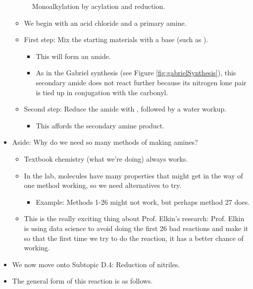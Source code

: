 \documentclass[../notes.tex]{subfiles}
\begin{document}
\begin{itemize}
\begin{figure}[H]
        \schemestop
        \caption{Monoalkylation by acylation and reduction.}
        \label{fig:acylReduce}
    \end{figure}
    \begin{itemize}
        \item We begin with an acid chloride and a primary amine.
        \item First step: Mix the starting materials with a base (such as ).
        \begin{itemize}
            \item This will form an amide.
            \item As in the Gabriel synthesis (see Figure \ref{fig:gabrielSynthesis}), this secondary amide does not react further because its nitrogen lone pair is tied up in conjugation with the carbonyl.
        \end{itemize}
        \item Second step: Reduce the amide with , followed by a water workup.
        \begin{itemize}
            \item This affords the secondary amine product.
        \end{itemize}
    \end{itemize}
    \item Aside: Why do we need so many methods of making amines?
    \begin{itemize}
        \item Textbook chemistry (what we're doing) always works.
        \item In the lab, molecules have many properties that might get in the way of one method working, so we need alternatives to try.
        \begin{itemize}
            \item Example: Methods 1-26 might not work, but perhaps method 27 does.
        \end{itemize}
        \item This is the really exciting thing about Prof. Elkin's research: Prof. Elkin is using data science to avoid doing the first 26 bad reactions and make it so that the first time we try to do the reaction, it has a better chance of working.
    \end{itemize}
    \item We now move onto Subtopic D.4: Reduction of nitriles.
    \item The general form of this reaction is as follows.
    \begin{figure}[h!]

\end{figure}
\end{itemize}
\end{document}
